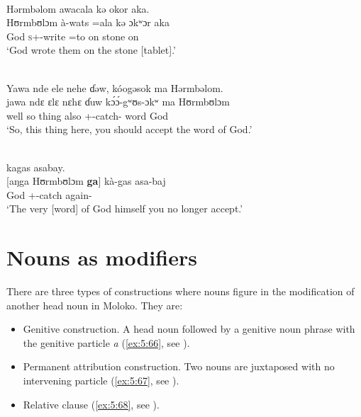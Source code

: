 \clearpage
\ea \label{ex:5:63}\\
Hərmbəlom  awacala  kə  okor  aka.\\
\gll  Hʊrmbʊlɔm à-wats    =ala   kə   ɔkʷɔr   aka\\
      God    \textsc{s}+{\PFV}-write  =to  on  stone  on\\
\glt  ‘God wrote them on the stone [tablet].’
\z

\ea \label{ex:5:64}\\
Yawa  nde  ele  nehe  ɗəw,  kóogəsok ma  Hərmbəlom.\\
\gll  jawa   ndɛ   ɛlɛ   nɛhɛ   ɗuw  k\'{ɔ}\'{ɔ}-gʷʊs-ɔkʷ     ma   Hʊrmbʊlɔm\\
       well    so  thing  {\DEM}  also  {\twoS}+{\POT}-catch-{\twoP}    word  God\\
\glt  ‘So, this thing here, you should accept the word of God.’ 
\z

\ea \label{ex:5:65}\\  kagas  asabay.\\
\gll  {}[aŋga   Hʊrmbʊlɔm   \textbf{ga}]     kà-gas     asa-baj\\
      {\POSS}  God    {\ADJ}    {\twoS}+{\PFV}-catch  again-{\NEG}\\
\glt  ‘The very [word] of God himself you no longer accept.’ 
\z

\section{Nouns as modifiers}\label{sec:5.4}
\hypertarget{RefHeading1211721525720847}{}
There are three types of constructions where nouns figure in the modification of another head noun in Moloko. They are:

\begin{itemize}
\item Genitive construction. A head noun followed by a genitive noun phrase with the genitive particle \textit{a} (\ref{ex:5:66}, see ).
\item Permanent attribution construction. Two nouns are juxtaposed with no intervening particle (\ref{ex:5:67}, see ).
\item Relative clause (\ref{ex:5:68}, see ). 
\end{itemize}

